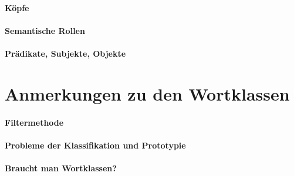 \paragraph*{Köpfe}

\paragraph*{Semantische Rollen}

\paragraph*{Prädikate, Subjekte, Objekte}


\section{Anmerkungen zu den Wortklassen}

\paragraph*{Filtermethode}

\paragraph*{Probleme der Klassifikation und Prototypie}

\paragraph*{Braucht man Wortklassen?}


